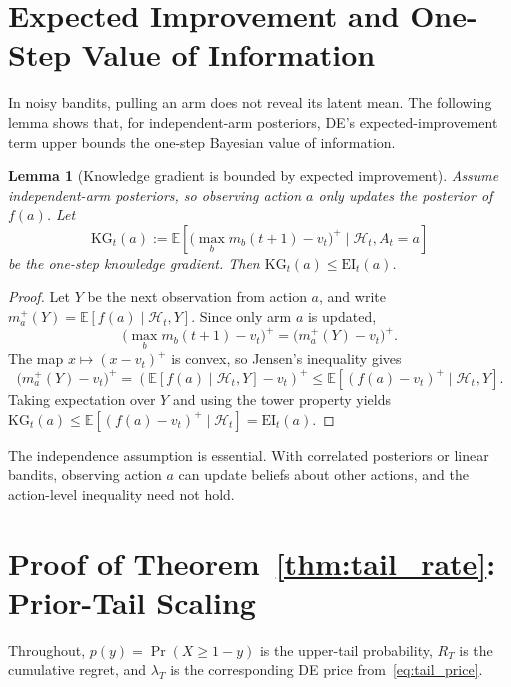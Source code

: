 \documentclass{article}
\newtheorem{lemma} {Lemma}
\newcommand{\Hc}{\mathcal{H}}
\newcommand{\E}{\mathbb{E}}
\newcommand{\EI}{\mathrm{EI}} %
\begin{document}
\section{Expected Improvement and One-Step Value of Information}
\label{app:kg_ei}

In noisy bandits, pulling an arm does not reveal its latent mean.
The following lemma shows that, for independent-arm posteriors, DE's expected-improvement term upper bounds the one-step Bayesian value of information.

\begin{lemma}[Knowledge gradient is bounded by expected improvement]
\label{lem:kg_le_ei}
Assume independent-arm posteriors, so observing action $a$ only updates the posterior of $f(a)$.
Let
\[
  \mathrm{KG}_t(a)
  :=
  \E\left[
    \bigl(\max_b m_b(t+1)-v_t\bigr)^+
    \mid \Hc_t,A_t=a
  \right]
\]
be the one-step knowledge gradient.
Then $\mathrm{KG}_t(a)\le \EI_t(a)$.
\end{lemma}

\begin{proof}
Let $Y$ be the next observation from action $a$, and write $m_a^+(Y)=\E[f(a)\mid \Hc_t,Y]$.
Since only arm $a$ is updated,
\[
  \bigl(\max_b m_b(t+1)-v_t\bigr)^+
  =
  \bigl(m_a^+(Y)-v_t\bigr)^+.
\]
The map $x\mapsto (x-v_t)^+$ is convex, so Jensen's inequality gives
\[
  \bigl(m_a^+(Y)-v_t\bigr)^+
  =
  \left(\E[f(a)\mid \Hc_t,Y]-v_t\right)^+
  \le
  \E[(f(a)-v_t)^+\mid \Hc_t,Y].
\]
Taking expectation over $Y$ and using the tower property yields
$\mathrm{KG}_t(a) \le \E[(f(a)-v_t)^+\mid \Hc_t] = \EI_t(a)$.
\end{proof}

The independence assumption is essential.
With correlated posteriors or linear bandits, observing action $a$ can update beliefs about other actions, and the action-level inequality need not hold.


\section{Proof of Theorem~\ref{thm:tail_rate}: Prior-Tail Scaling}
\label{app:tail_scaling}

Throughout, $p(y)=\Pr(X\ge 1-y)$ is the upper-tail probability, $R_T$ is the cumulative regret, and $\lambda_T$ is the corresponding DE price from~\eqref{eq:tail_price}.
\end{document}
